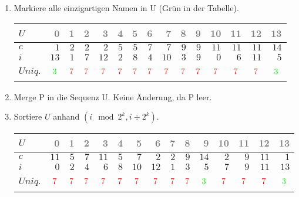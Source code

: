 \begin{enumerate}
\item 
Markiere alle einzigartigen Namen in U (Grün in der Tabelle).
\begin{center}
\small\begin{tabular}{lrrrrrrrrrrrrrr}
    \toprule 
    $U$ & \textcolor{gray}{0} & \textcolor{gray}{1} & \textcolor{gray}{2} & \textcolor{gray}{3} & \textcolor{gray}{4} & \textcolor{gray}{5} & \textcolor{gray}{6} & \textcolor{gray}{7} & \textcolor{gray}{8} & \textcolor{gray}{9} & \textcolor{gray}{10} & \textcolor{gray}{11} & \textcolor{gray}{12} & \textcolor{gray}{13}\\
    \midrule 
    $c$ & $1$ & $2$ & $2$ & $2$ & $5$ & $5$ & $7$ & $7$ & $9$ & $9$ & $11$ & $11$ & $11$ & $14$ \\
    $i$ & $13$ & $1$ & $7$ & $12$ & $2$ & $8$ & $4$ & $10$ & $3$ & $9$ & $0$ & $6$ & $11$ & $5$ \\
    $Uniq.$ & $$\cmarkc$$ & $$\xmarkc$$ & $$\xmarkc$$ & $$\xmarkc$$ & $$\xmarkc$$ & $$\xmarkc$$ & $$\xmarkc$$ & $$\xmarkc$$ & $$\xmarkc$$ & $$\xmarkc$$ & $$\xmarkc$$ & $$\xmarkc$$ & $$\xmarkc$$ & $$\cmarkc$$ \\
    \bottomrule 
\end{tabular}
\end{center}

\item 
Merge P in die Sequenz U. Keine Änderung, da P leer.

\item 
Sortiere $U$ anhand $(i \mod 2^k, i \div 2^k)$.
\begin{center}
\small\begin{tabular}{lrrrrrrrrrrrrrr}
    \toprule 
    $U$ & \textcolor{gray}{0} & \textcolor{gray}{1} & \textcolor{gray}{2} & \textcolor{gray}{3} & \textcolor{gray}{4} & \textcolor{gray}{5} & \textcolor{gray}{6} & \textcolor{gray}{7} & \textcolor{gray}{8} & \textcolor{gray}{9} & \textcolor{gray}{10} & \textcolor{gray}{11} & \textcolor{gray}{12} & \textcolor{gray}{13}\\
    \midrule 
    $c$ & $11$ & $5$ & $7$ & $11$ & $5$ & $7$ & $2$ & $2$ & $9$ & $14$ & $2$ & $9$ & $11$ & $1$ \\
    $i$ & $0$ & $2$ & $4$ & $6$ & $8$ & $10$ & $12$ & $1$ & $3$ & $5$ & $7$ & $9$ & $11$ & $13$ \\
    $Uniq.$ & $$\xmarkc$$ & $$\xmarkc$$ & $$\xmarkc$$ & $$\xmarkc$$ & $$\xmarkc$$ & $$\xmarkc$$ & $$\xmarkc$$ & $$\xmarkc$$ & $$\xmarkc$$ & $$\cmarkc$$ & $$\xmarkc$$ & $$\xmarkc$$ & $$\xmarkc$$ & $$\cmarkc$$ \\
    \bottomrule 
\end{tabular}
\end{center}


\end{enumerate}
